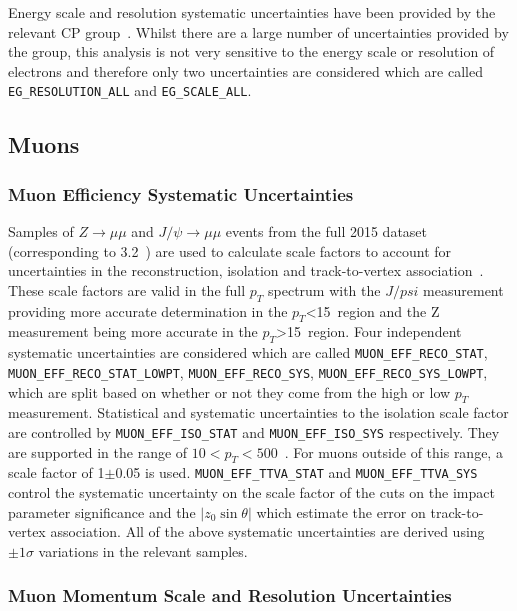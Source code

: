 Energy scale and resolution systematic uncertainties have been provided by the
relevant CP group~\cite{EgammaCalibTWiki}. Whilst there are a large number of
uncertainties provided by the group, this analysis is not very sensitive to the
energy scale or resolution of electrons and therefore only two uncertainties are
considered which are called \texttt{EG\_RESOLUTION\_ALL} and
\texttt{EG\_SCALE\_ALL}.

\subsection{Muons}

\subsubsection{Muon Efficiency Systematic Uncertainties}

Samples of $Z \to \mu\mu$ and $J/\psi \to \mu\mu$ events from the full 2015
dataset (corresponding to 3.2~\invfb) are used to calculate scale factors to
account for uncertainties in the reconstruction, isolation and track-to-vertex
association~\cite{muonTWiki}. These scale factors are valid in the full $p_T$
spectrum with the $J/psi$ measurement providing more accurate determination in
the $p_T$<15~\GeV region and the Z measurement being more accurate in the
$p_T$>15~\GeV region. Four independent systematic uncertainties are considered
which are called \texttt{MUON\_EFF\_RECO\_STAT},
\texttt{MUON\_EFF\_RECO\_STAT\_LOWPT}, \texttt{MUON\_EFF\_RECO\_SYS},
\texttt{MUON\_EFF\_RECO\_SYS\_LOWPT}, which are split based on whether or not
they come from the high or low $p_T$ measurement. Statistical and systematic
uncertainties to the isolation scale factor are controlled by
\texttt{MUON\_EFF\_ISO\_STAT} and \texttt{MUON\_EFF\_ISO\_SYS} respectively.
They are supported in the range of $10 < p_T < 500$~\GeV. For muons outside of
this range, a scale factor of 1$\pm$0.05 is used.
\texttt{MUON\_EFF\_TTVA\_STAT} and \texttt{MUON\_EFF\_TTVA\_SYS} control the
systematic uncertainty on the scale factor of the cuts on the impact parameter
significance and the $|z_0\sin\theta|$ which estimate the error on
track-to-vertex association. All of the above systematic uncertainties are
derived using $\pm 1\sigma$ variations in the relevant samples.

\subsubsection{Muon Momentum Scale and Resolution Uncertainties}

